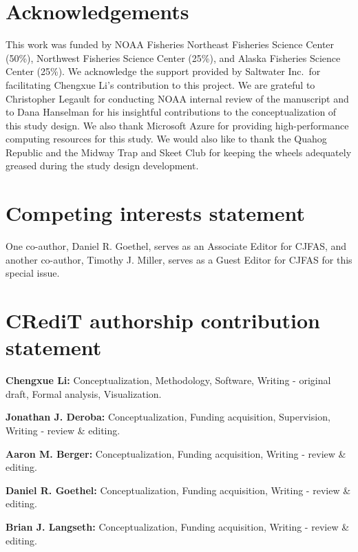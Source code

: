 \documentclass[
  12pt,
]{article}
\begin{document}
\hypertarget{acknowledgements}{%
\section{Acknowledgements}\label{acknowledgements}}

This work was funded by NOAA Fisheries Northeast Fisheries Science
Center (50\%), Northwest Fisheries Science Center (25\%), and Alaska
Fisheries Science Center (25\%). We acknowledge the support provided by
Saltwater Inc.~for facilitating Chengxue Li's contribution to this
project. We are grateful to Christopher Legault for conducting NOAA
internal review of the manuscript and to Dana Hanselman for his
insightful contributions to the conceptualization of this study design.
We also thank Microsoft Azure for providing high-performance computing
resources for this study. We would also like to thank the Quahog
Republic and the Midway Trap and Skeet Club for keeping the wheels
adequately greased during the study design development.

\hypertarget{competing-interests-statement}{%
\section{Competing interests
statement}\label{competing-interests-statement}}

One co-author, Daniel R. Goethel, serves as an Associate Editor for
CJFAS, and another co-author, Timothy J. Miller, serves as a Guest
Editor for CJFAS for this special issue.

\hypertarget{credit-authorship-contribution-statement}{%
\section{CRediT authorship contribution
statement}\label{credit-authorship-contribution-statement}}

\textbf{Chengxue Li:} Conceptualization, Methodology, Software, Writing
- original draft, Formal analysis, Visualization.

\textbf{Jonathan J. Deroba:} Conceptualization, Funding acquisition,
Supervision, Writing - review \& editing.

\textbf{Aaron M. Berger:} Conceptualization, Funding acquisition,
Writing - review \& editing.

\textbf{Daniel R. Goethel:} Conceptualization, Funding acquisition,
Writing - review \& editing.

\textbf{Brian J. Langseth:} Conceptualization, Funding acquisition,
Writing - review \& editing.
\end{document}
